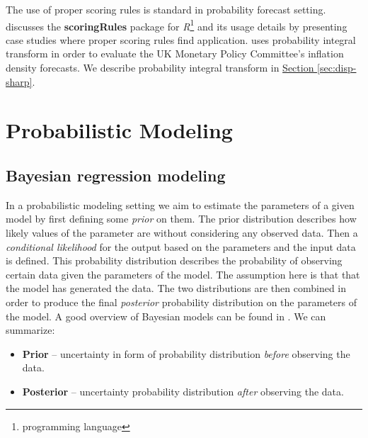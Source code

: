 \documentclass[12pt,a4paper,twoside]{scrartcl}
\numberwithin{equation}{section}
\newcommand{\refsec}[1]{\hyperref[#1]{Section \ref*{#1}}}
\begin{document}
The use of proper scoring rules is standard in probability forecast setting. \cite{jordan2017} discusses the \textbf{scoringRules} package for \emph{R}\footnote{programming language} and its usage details by presenting case studies where proper scoring rules find application. \cite{clements2004} uses probability integral transform in order to evaluate the UK Monetary Policy Committee's inflation density forecasts. We describe probability integral transform in \refsec{sec:disp-sharp}.
\section{Probabilistic Modeling}\label{sec:prob-modeling}
\subsection{Bayesian regression modeling}\label{sec:bayesian-inference}
In a probabilistic modeling setting we aim to estimate the parameters of a given model by first defining some \emph{prior} on them. The prior distribution describes how likely values of the parameter are without considering any observed data. Then a \emph{conditional likelihood} for the output based on the parameters and the input data is defined. This probability distribution describes the probability of observing certain data given the parameters of the model. The assumption here is that that the model has generated the data. The two distributions are then combined in order to produce the final \emph{posterior} probability distribution on the parameters of the model. A good overview of Bayesian models can be found in \cite{mitchell97}. We can summarize:
\begin{itemize}
\item \textbf{Prior} -- uncertainty in form of probability distribution \emph{before} observing the data.
\item \textbf{Posterior} -- uncertainty probability distribution \emph{after} observing the data.
\end{itemize}
\end{document}
